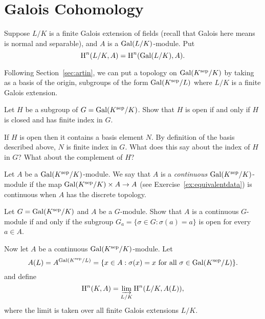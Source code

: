 \section{Galois Cohomology}

Suppose $L/K$ is a finite Galois extension of fields
(recall that Galois here means is normal and separable),
and $A$ is a $\operatorname{Gal}(L/K)$-module.
Put
$$
	\operatorname{H}^n(L/K, A) = \operatorname{H}^n(\operatorname{Gal}(L/K), A).
$$

Following Section~\ref{sec:artin}, we can put a topology
on $\operatorname{Gal}(K^{\operatorname{sep}}/K)$ by taking as a basis of the origin,
subgroups of the form $\operatorname{Gal}(K^{\operatorname{sep}}/L)$ where $L/K$
is a finite Galois extension.

\begin{exercise}
	Let $H$ be a subgroup of $G = \operatorname{Gal}(K^{\operatorname{sep}}/K)$.
	Show that $H$ is open if and only if $H$ is closed
	and has finite index in $G$.

	\begin{hint}
		If $H$ is open then it contains a basis element $N$.
		By definition of the basis described above, $N$ is
		finite index in $G$. What does this say about
		the index of $H$ in $G$? What about the complement
		of $H$?
	\end{hint}
\end{exercise}

\begin{definition}
	Let $A$ be a $\operatorname{Gal}(K^{\operatorname{sep}}/K)$-module. We say that $A$
	is a \emph{continuous} $\operatorname{Gal}(K^{\operatorname{sep}}/K)$-module if the map
	$\operatorname{Gal}(K^{\operatorname{sep}}/K)\times A \to A$
	(see Exercise~\ref{ex:equivalentdata}) is continuous when $A$
	has the discrete topology.
\end{definition}

\begin{exercise}
	Let $G = \operatorname{Gal}(K^{\operatorname{sep}}/K)$ and $A$ be a $G$-module.
	Show that $A$ is a continuous $G$-module
	if and only if the subgroup
	$G_a = \{\sigma \in G : \sigma(a) = a\}$ is open
	for every $a\in A$.
\end{exercise}

Now let $A$ be a continuous $\operatorname{Gal}(K^{\operatorname{sep}}/K)$-module. Let
$$
	A(L) = A^{\operatorname{Gal}(K^{\operatorname{sep}}/L)} = \{x \in A : \sigma(x) = x
	\text{ for all } \sigma \in\operatorname{Gal}(K^{\operatorname{sep}}/L)\}.
$$
and define
$$
	\operatorname{H}^n(K,A) = \varinjlim_{L/K} \operatorname{H}^n(L/K,A(L)),
$$
where the limit is taken over all finite Galois
extensions $L/K$.

